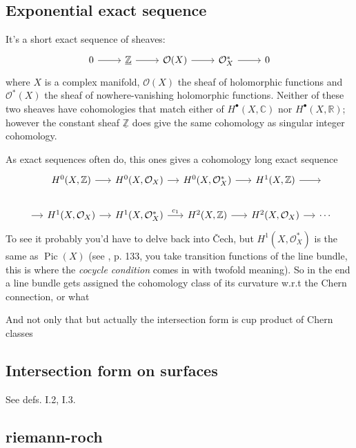 \subsection{Exponential exact sequence}

It's a short exact sequence of sheaves:
\[\begin{tikzcd}0\arrow[r]&\underline{\mathbb{Z}}\arrow[r]&\mathcal{O}(X)\arrow[r]&\mathcal{O}^*_X\arrow[r]&0\end{tikzcd}\]
where \(X\) is a complex manifold, \(\mathcal{O}(X)\) the sheaf of holomorphic functions and \(\mathcal{O} ^*(X)\) the sheaf of nowhere-vanishing holomorphic functions. Neither of these two sheaves have cohomologies that match either of \(H^{\bullet}(X,\mathbb{C})\) nor \(H^{\bullet}(X,\mathbb{R})\); however the constant sheaf \(\underline{\mathbb{Z}}\) does give the same cohomology as singular integer cohomology.

As exact sequences often do, this ones gives a cohomology long exact sequence
\[\begin{tikzcd}[column sep=small]
	\leavevmode&H^{0}(X,\mathbb{Z})\arrow[r]&H^{0}(X,\mathcal{O}_X)\arrow[r]&H^{0}(X,\mathcal{O}_X^*)\arrow[r]&H^{1}(X,\mathbb{Z})\arrow[r]& \leavevmode\\
	\arrow[r]&H^{1}(X,\mathcal{O}_X)\arrow[r]&H^{1}(X,\mathcal{O}_X^*)\arrow[r,"c_1"]&H^{2}(X,\mathbb{Z})\arrow[r]&H^{2}(X,\mathcal{O}_X)\arrow[r]&\cdots
\end{tikzcd}\]
To see it probably you'd have to delve back into \v Cech, but \(H^{1}(X,\mathcal{O}_X^*)\) is the same as \(\operatorname{Pic}(X)\) (see \cite{gri}, p. 133, you take transition functions of the line bundle, this is where the \textit{cocycle condition} comes in with twofold meaning). So in the end a line bundle gets assigned the cohomology class of its curvature w.r.t the Chern connection, or what

And not only that but actually the intersection form is cup product of Chern classes

\subsection{Intersection form on surfaces}

See \cite{beu} defs. I.2, I.3.


\subsection{riemann-roch}

